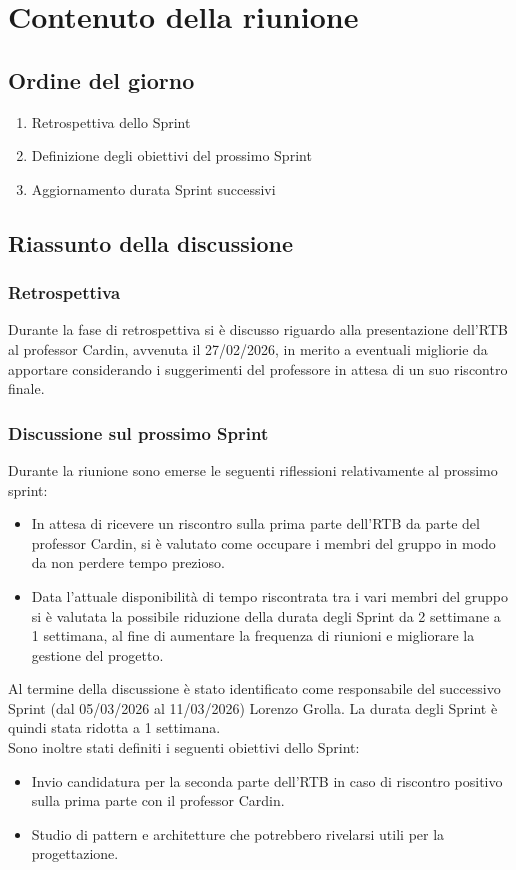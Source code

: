 \documentclass[a4paper, 11pt]{article}
\begin{document}
\section{Contenuto della riunione}
\subsection{Ordine del giorno}
\begin{enumerate}
    \item Retrospettiva dello Sprint
    \item Definizione degli obiettivi del prossimo Sprint
    \item Aggiornamento durata Sprint successivi
\end{enumerate}
\newpage
\subsection{Riassunto della discussione}
\subsubsection{Retrospettiva}
Durante la fase di retrospettiva si è discusso riguardo alla presentazione dell'RTB al professor Cardin, avvenuta il 27/02/2026, in merito a eventuali migliorie da apportare considerando i suggerimenti del professore in attesa di un suo riscontro finale.


\subsubsection{Discussione sul prossimo Sprint}
Durante la riunione sono emerse le seguenti riflessioni relativamente al prossimo sprint:
\begin{itemize}
    \item In attesa di ricevere un riscontro sulla prima parte dell'RTB da parte del professor Cardin, si è valutato come occupare i membri del gruppo in modo da non perdere tempo prezioso.
    \item Data l'attuale disponibilità di tempo riscontrata tra i vari membri del gruppo si è valutata la possibile riduzione della durata degli Sprint da 2 settimane a 1 settimana, al fine di aumentare la frequenza di riunioni e migliorare la gestione del progetto.
\end{itemize}
Al termine della discussione è stato identificato come responsabile del successivo Sprint (dal 05/03/2026 al 11/03/2026) Lorenzo Grolla. La durata degli Sprint è quindi stata ridotta a 1 settimana. 
\\
Sono inoltre stati definiti i seguenti obiettivi dello Sprint:
\begin{itemize}
    \item Invio candidatura per la seconda parte dell'RTB in caso di riscontro positivo sulla prima parte con il professor Cardin.
    \item Studio di pattern e architetture che potrebbero rivelarsi utili per la progettazione.
\end{itemize}
\end{document}
